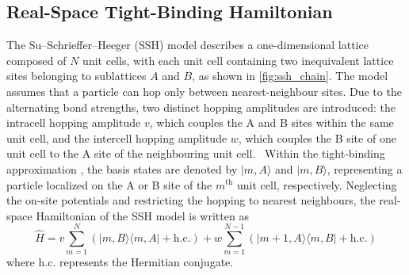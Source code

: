 \documentclass[11pt, a4paper]{article}
\begin{document}
\subsection{Real-Space Tight-Binding Hamiltonian}
The Su--Schrieffer--Heeger (SSH) model describes a one-dimensional lattice composed of $N$ unit cells, with each unit cell containing two inequivalent lattice sites belonging to sublattices $A$ and $B$, as shown in \cref{fig:ssh_chain}.
The model assumes that a particle can hop only between nearest-neighbour sites.
Due to the alternating bond strengths, two distinct hopping amplitudes are introduced: the intracell hopping amplitude $v$, which couples the A and B sites within the same unit cell, and the intercell hopping amplitude $w$, which couples the B site of one unit cell to the A site of the neighbouring unit cell.~\cite{ssh1979,asboth2015}
Within the tight-binding approximation \cite{ashcroft1976,asboth2015}, the basis states are denoted by $|m,A\rangle$ and $|m,B\rangle$, representing a particle localized on the A or B site of the $m^{\text{th}}$ unit cell, respectively.
Neglecting the on-site potentials and restricting the hopping to nearest neighbours, the real-space Hamiltonian of the SSH model is written as
\begin{equation}
\label{eq:ssh_hamiltonian}
    \hat{H}= v\sum_{m=1}^{N} \left( |m,B\rangle \langle m,A| + \mathrm{h.c.} \right) + w \sum_{m=1}^{N-1}\left( |m+1,A\rangle \langle m,B| + \mathrm{h.c.} \right)
\end{equation}
where $\mathrm{h.c.}$ represents the Hermitian conjugate.
\end{document}
